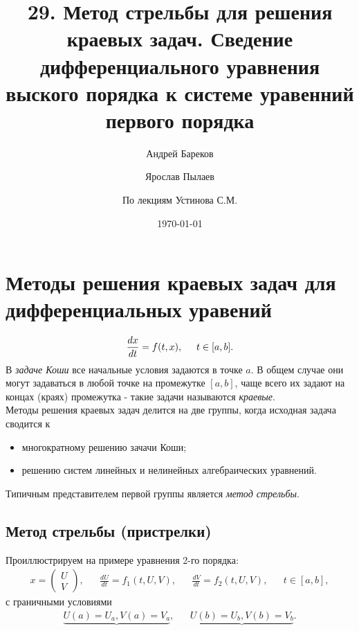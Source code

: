 \documentclass[a4paper,11pt]{article}
\title{29. Метод стрельбы для решения краевых задач. Сведение дифференциального уравнения выского порядка
      к системе уравенний первого порядка}
\author{Андрей Бареков \and Ярослав Пылаев \and По лекциям Устинова С.М.}
\date{\today}
\begin{document}
\maketitle
\newpage

\section{Методы решения краевых задач для дифференциальных уравений}
\begin{equation*}
  \frac{dx}{dt} = f(t, x), \hspace{5mm} t \in [a, b].
\end{equation*}
В \textit{задаче Коши} все начальные условия задаются в точке $a$. В общем случае они могут задаваться в любой точке
      на промежутке $[a, b]$, чаще всего их задают на концах (краях) промежутка - такие задачи называются \textit{краевые}. \\

\noindent Методы решения краевых задач делится на две группы, когда исходная задача сводится к
\begin{itemize}
  \item многократному решению зачачи Коши;
  \item решению систем линейных и нелинейных алгебраических уравнений.
\end{itemize}

\noindent Типичным представителем первой группы является \textit{метод стрельбы}.

\subsection{Метод стрельбы (пристрелки)}
Проиллюстрируем на примере уравнения 2-го порядка:
\begin{align*}
  x = \begin{pmatrix} U \\ V \end{pmatrix}, && \frac{dU}{dt} = f_1(t, U, V), && \frac{dV}{dt} = f_2(t, U, V), && t \in [a, b],
\end{align*}
с граничными условиями
\begin{align*}
  \underbrace{U(a) = U_a, V(a) = V_a}, && \underbrace{U(b) = U_b, V(b) = V_b}.
\end{align*}
\end{document}
